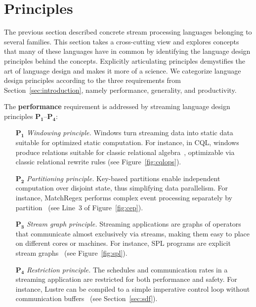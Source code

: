 \section{Principles}\label{sec:principles}

The previous section described concrete stream processing languages
belonging to several families. This section takes a cross-cutting view
and explores concepts that many of these languages have in common by
identifying the language design principles behind the concepts.
Explicitly articulating principles demystifies the art of language
design and makes it more of a science. We categorize language design
principles according to the three requirements from
Section~\ref{sec:introduction}, namely performance, generality, and
productivity.

The \textbf{performance} requirement is addressed by streaming
language design principles $\mathbf{P_1}$--$\mathbf{P_4}$:
\begin{itemize}
  \item[$\mathbf{P_1}$] \emph{Windowing principle.} Windows turn streaming
    data into static data suitable for optimized static computation.
    For instance, in CQL, windows produce relations suitable for
    classic relational algebra~\cite{arasu_babu_widom_2006},
    optimizable via classic relational rewrite rules (see
    Figure~\ref{fig:cqlops}).
  \item[$\mathbf{P_2}$] \emph{Partitioning principle.} Key-based partitions
    enable independent computation over disjoint state, thus
    simplifying data parallelism. For instance, MatchRegex performs
    complex event processing separately by
    partition~\cite{hirzel_2012} (see Line~3 of Figure~\ref{fig:cep}).
  \item[$\mathbf{P_3}$] \emph{Stream graph principle.} Streaming
    applications are graphs of operators that communicate almost
    exclusively via streams, making them easy to place on different
    cores or machines. For instance, SPL programs are explicit stream
    graphs~\cite{hirzel_schneider_gedik_2017} (see
    Figure~\ref{fig:spl}).
  \item[$\mathbf{P_4}$] \emph{Restriction principle.} The schedules and
    communication rates in a streaming application are restricted for
    both performance and safety. For instance, Lustre can be compiled
    to a simple imperative control loop without communication
    buffers~\cite{lustre_1987} (see Section~\ref{sec:sdf}).
\end{itemize}

